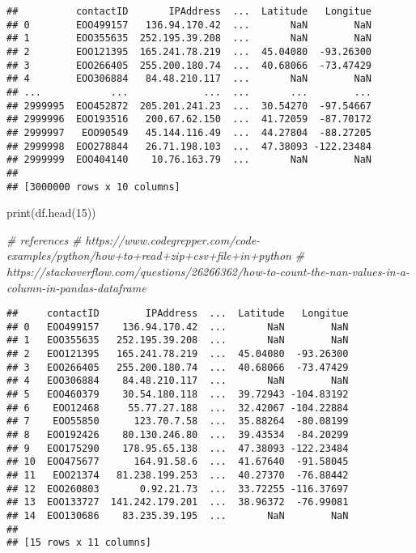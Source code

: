\documentclass[
]{article}
\newenvironment{Shaded}{\begin{snugshade}}{\end{snugshade}}
\newcommand{\BuiltInTok}[1]{#1}
\newcommand{\CommentTok}[1]{\textcolor[rgb]{0.56,0.35,0.01}{\textit{#1}}}
\newcommand{\DecValTok}[1]{\textcolor[rgb]{0.00,0.00,0.81}{#1}}
\newcommand{\NormalTok}[1]{#1}
\begin{document}
\begin{verbatim}
##          contactID       IPAddress  ...  Latitude   Longitue
## 0        EOO499157   136.94.170.42  ...       NaN        NaN
## 1        EOO355635  252.195.39.208  ...       NaN        NaN
## 2        EOO121395  165.241.78.219  ...  45.04080  -93.26300
## 3        EOO266405  255.200.180.74  ...  40.68066  -73.47429
## 4        EOO306884   84.48.210.117  ...       NaN        NaN
## ...            ...             ...  ...       ...        ...
## 2999995  EOO452872  205.201.241.23  ...  30.54270  -97.54667
## 2999996  EOO193516   200.67.62.150  ...  41.72059  -87.70172
## 2999997   EOO90549   45.144.116.49  ...  44.27804  -88.27205
## 2999998  EOO278844   26.71.198.103  ...  47.38093 -122.23484
## 2999999  EOO404140    10.76.163.79  ...       NaN        NaN
## 
## [3000000 rows x 10 columns]
\end{verbatim}

\begin{Shaded}
\begin{Highlighting}[]
\BuiltInTok{print}\NormalTok{(df.head(}\DecValTok{15}\NormalTok{))}

\CommentTok{# references }
\CommentTok{# https://www.codegrepper.com/code-examples/python/how+to+read+zip+csv+file+in+python}
\CommentTok{# https://stackoverflow.com/questions/26266362/how-to-count-the-nan-values-in-a-column-in-pandas-dataframe}
\end{Highlighting}
\end{Shaded}

\begin{verbatim}
##     contactID        IPAddress  ...  Latitude   Longitue
## 0   EOO499157    136.94.170.42  ...       NaN        NaN
## 1   EOO355635   252.195.39.208  ...       NaN        NaN
## 2   EOO121395   165.241.78.219  ...  45.04080  -93.26300
## 3   EOO266405   255.200.180.74  ...  40.68066  -73.47429
## 4   EOO306884    84.48.210.117  ...       NaN        NaN
## 5   EOO460379    30.54.180.118  ...  39.72943 -104.83192
## 6    EOO12468     55.77.27.188  ...  32.42067 -104.22884
## 7    EOO55850      123.70.7.58  ...  35.88264  -80.08199
## 8   EOO192426    80.130.246.80  ...  39.43534  -84.20299
## 9   EOO175290    178.95.65.138  ...  47.38093 -122.23484
## 10  EOO475677      164.91.58.6  ...  41.67640  -91.58045
## 11   EOO21374   81.238.199.253  ...  40.27370  -76.88442
## 12  EOO260803       0.92.21.73  ...  33.72255 -116.37697
## 13  EOO133727  141.242.179.201  ...  38.96372  -76.99081
## 14  EOO130686    83.235.39.195  ...       NaN        NaN
## 
## [15 rows x 11 columns]
\end{verbatim}
\end{document}

